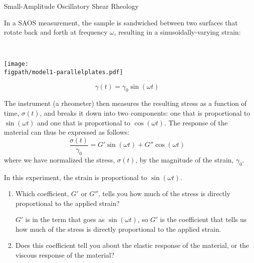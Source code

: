 \begin{activity}[extension]{Small-Amplitude Oscillatory Shear Rheology}
\begin{model}
	In a SAOS measurement, the sample is sandwiched between two surfaces that rotate back and forth at frequency $\omega$, resulting in a sinusoidally-varying strain:
	
	\vspace{0.1in}
	\begin{minipage}{0.15\textwidth}
	~
	\end{minipage}
	\begin{minipage}{0.35\textwidth}
		\centerline{\texttt{[image: \\figpath/model1-parallelplates.pdf]}}
	\end{minipage}
	\begin{minipage}{0.4\textwidth}
		\begin{equation*}
			\gamma(t) = \gamma_0 \sin(\omega t)
		\end{equation*}
	\end{minipage}
	\vspace{0.1in}
	
	The instrument (a rheometer) then measures the resulting stress as a function of time, $\sigma(t)$, and breaks it down into two components: one that is proportional to $\sin(\omega t)$ and one that is proportional to $\cos(\omega t)$. The response of the material can thus be expressed as follows:
	\begin{equation*}
		\frac{\sigma(t)}{\gamma_0} = G' \sin(\omega t) + G'' \cos(\omega t)
	\end{equation*}
	where we have normalized the stress, $\sigma(t)$, by the magnitude of the strain, $\gamma_0$.

\end{model}

\begin{ctqs}
		
		\question In this experiment, the strain is proportional to $\sin(\omega t)$.  
			\begin{enumerate}
				\item Which coefficient, $G'$ or $G''$, tells you how much of the stress is directly proportional to the applied strain?
	
					\begin{solution}[1.1in]
						$G'$ is in the term that goes as $\sin(\omega t)$, so $G'$ is the coefficient that tells us how much of the stress is directly proportional to the applied strain.
					\end{solution}
		
		\item Does this coefficient tell you about the elastic response of the material, or the viscous response of the material?
	

\end{enumerate}
\end{ctqs}
\end{activity}
